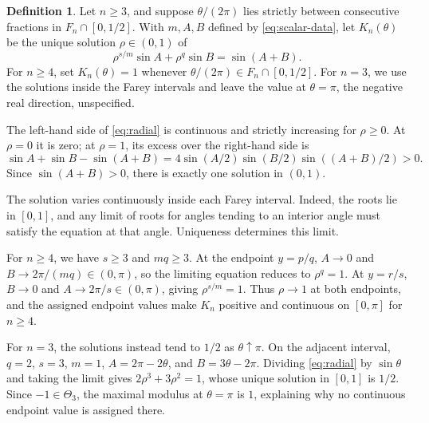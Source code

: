 \documentclass[11pt,a4paper]{article}
\theoremstyle{definition}
\newtheorem{definition}[theorem]{Definition}
\theoremstyle{remark}
\numberwithin{equation}{section}
\begin{document}
\begin{definition}\label{def:candidate}
Let $n\ge3$, and suppose $\theta/(2\pi)$ lies strictly between consecutive fractions in $F_n\cap[0,1/2]$. With $m,A,B$ defined by \eqref{eq:scalar-data}, let $K_n(\theta)$ be the unique solution $\rho\in(0,1)$ of
\begin{equation}\label{eq:radial}
 \rho^{s/m}\sin A+\rho^q\sin B=\sin(A+B).
\end{equation}
For $n\ge4$, set $K_n(\theta)=1$ whenever $\theta/(2\pi)\in F_n\cap[0,1/2]$. For $n=3$, we use the solutions inside the Farey intervals and leave the value at $\theta=\pi$, the negative real direction, unspecified.
\end{definition}
The left-hand side of \eqref{eq:radial} is continuous and strictly increasing for $\rho\ge0$. At $\rho=0$ it is zero; at $\rho=1$, its excess over the right-hand side is
\[
 \sin A+\sin B-\sin(A+B)
 =4\sin(A/2)\sin(B/2)\sin((A+B)/2)>0.
\]
Since $\sin(A+B)>0$, there is exactly one solution in $(0,1)$.

The solution varies continuously inside each Farey interval. Indeed, the roots lie in $[0,1]$, and any limit of roots for angles tending to an interior angle must satisfy the equation at that angle. Uniqueness determines this limit.

For $n\ge4$, we have $s\ge3$ and $mq\ge3$. At the endpoint $y=p/q$, $A\to0$ and $B\to2\pi/(mq)\in(0,\pi)$, so the limiting equation reduces to $\rho^q=1$. At $y=r/s$, $B\to0$ and $A\to2\pi/s\in(0,\pi)$, giving $\rho^{s/m}=1$. Thus $\rho\to1$ at both endpoints, and the assigned endpoint values make $K_n$ positive and continuous on $[0,\pi]$ for $n\ge4$.

For $n=3$, the solutions instead tend to $1/2$ as $\theta\uparrow\pi$. On the adjacent interval, $q=2$, $s=3$, $m=1$, $A=2\pi-2\theta$, and $B=3\theta-2\pi$. Dividing \eqref{eq:radial} by $\sin\theta$ and taking the limit gives $2\rho^3+3\rho^2=1$, whose unique solution in $[0,1]$ is $1/2$. Since $-1\in\Theta_3$, the maximal modulus at $\theta=\pi$ is $1$, explaining why no continuous endpoint value is assigned there.
\end{document}

